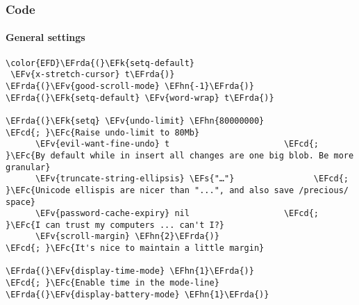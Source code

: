 \documentclass[a4wide,10pt]{article}
\newcommand{\EFc}[1]{\textcolor{EFc}{#1}} %
\newcommand{\EFcd}[1]{\textcolor{EFcd}{#1}} %
\newcommand{\EFs}[1]{\textcolor{EFs}{#1}} %
\newcommand{\EFk}[1]{\textcolor{EFk}{#1}} %
\newcommand{\EFv}[1]{\textcolor{EFv}{#1}} %
\newcommand{\EFhn}[1]{\textcolor{EFhn}{\textbf{#1}}} %
\newcommand{\EFrda}[1]{\textcolor{EFrda}{#1}} %
\begin{document}
\subsubsection{Code}
\label{sec:org6cca069}
\paragraph{General settings}
\label{sec:orgf28c29c}
\begin{Code}
\begin{Verbatim}
\color{EFD}\EFrda{(}\EFk{setq-default}
 \EFv{x-stretch-cursor} t\EFrda{)}
\EFrda{(}\EFv{good-scroll-mode} \EFhn{-1}\EFrda{)}
\EFrda{(}\EFk{setq-default} \EFv{word-wrap} t\EFrda{)}

\EFrda{(}\EFk{setq} \EFv{undo-limit} \EFhn{80000000}                         \EFcd{; }\EFc{Raise undo-limit to 80Mb}
      \EFv{evil-want-fine-undo} t                       \EFcd{; }\EFc{By default while in insert all changes are one big blob. Be more granular}
      \EFv{truncate-string-ellipsis} \EFs{"…"}                \EFcd{; }\EFc{Unicode ellispis are nicer than "...", and also save /precious/ space}
      \EFv{password-cache-expiry} nil                   \EFcd{; }\EFc{I can trust my computers ... can't I?}
      \EFv{scroll-margin} \EFhn{2}\EFrda{)}                            \EFcd{; }\EFc{It's nice to maintain a little margin}

\EFrda{(}\EFv{display-time-mode} \EFhn{1}\EFrda{)}                             \EFcd{; }\EFc{Enable time in the mode-line}
\EFrda{(}\EFv{display-battery-mode} \EFhn{1}\EFrda{)}
\end{Verbatim}
\end{Code}
\end{document}
